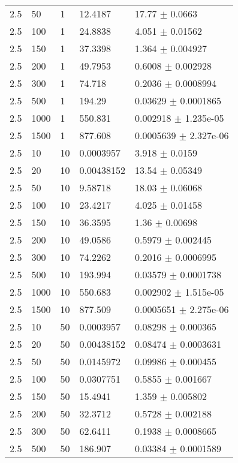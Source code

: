 \begin{longtable}{lllll}
 2.5 &    50 &     1 &  12.4187 &    17.77 $\pm$   0.0663 \\
 2.5 &   100 &     1 &  24.8838 &    4.051 $\pm$  0.01562 \\
 2.5 &   150 &     1 &  37.3398 &    1.364 $\pm$ 0.004927 \\
 2.5 &   200 &     1 &  49.7953 &   0.6008 $\pm$ 0.002928 \\
 2.5 &   300 &     1 &   74.718 &   0.2036 $\pm$ 0.0008994 \\
 2.5 &   500 &     1 &   194.29 &  0.03629 $\pm$ 0.0001865 \\
 2.5 &  1000 &     1 &  550.831 & 0.002918 $\pm$ 1.235e-05 \\
 2.5 &  1500 &     1 &  877.608 & 0.0005639 $\pm$ 2.327e-06 \\
 2.5 &    10 &    10 & 0.0003957 &    3.918 $\pm$   0.0159 \\
 2.5 &    20 &    10 & 0.00438152 &    13.54 $\pm$  0.05349 \\
 2.5 &    50 &    10 &  9.58718 &    18.03 $\pm$  0.06068 \\
 2.5 &   100 &    10 &  23.4217 &    4.025 $\pm$  0.01458 \\
 2.5 &   150 &    10 &  36.3595 &     1.36 $\pm$  0.00698 \\
 2.5 &   200 &    10 &  49.0586 &   0.5979 $\pm$ 0.002445 \\
 2.5 &   300 &    10 &  74.2262 &   0.2016 $\pm$ 0.0006995 \\
 2.5 &   500 &    10 &  193.994 &  0.03579 $\pm$ 0.0001738 \\
 2.5 &  1000 &    10 &  550.683 & 0.002902 $\pm$ 1.515e-05 \\
 2.5 &  1500 &    10 &  877.509 & 0.0005651 $\pm$ 2.275e-06 \\
 2.5 &    10 &    50 & 0.0003957 &  0.08298 $\pm$ 0.000365 \\
 2.5 &    20 &    50 & 0.00438152 &  0.08474 $\pm$ 0.0003631 \\
 2.5 &    50 &    50 & 0.0145972 &  0.09986 $\pm$ 0.000455 \\
 2.5 &   100 &    50 & 0.0307751 &   0.5855 $\pm$ 0.001667 \\
 2.5 &   150 &    50 &  15.4941 &    1.359 $\pm$ 0.005802 \\
 2.5 &   200 &    50 &  32.3712 &   0.5728 $\pm$ 0.002188 \\
 2.5 &   300 &    50 &  62.6411 &   0.1938 $\pm$ 0.0008665 \\
 2.5 &   500 &    50 &  186.907 &  0.03384 $\pm$ 0.0001589 \\

\end{longtable}
